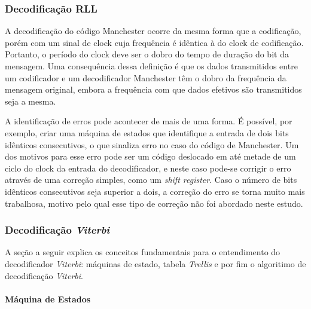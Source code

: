 	\subsubsection{Decodificação RLL}
	
	A decodificação do código Manchester ocorre da mesma forma que a codificação, porém com um sinal de clock cuja frequência é idêntica à do clock de codificação. Portanto, o período do clock deve ser o dobro do tempo de duração do bit da mensagem. Uma consequência dessa definição é que os dados transmitidos entre um codificador e um decodificador Manchester têm o dobro da frequência da mensagem original, embora a frequência com que dados efetivos são transmitidos seja a mesma.
	
	A identificação de erros pode acontecer de mais de uma forma. É possível, por exemplo, criar uma máquina de estados que identifique a entrada de dois bits idênticos consecutivos, o que sinaliza erro no caso do código de Manchester. Um dos motivos para esse erro pode ser um código deslocado em até metade de um ciclo do clock da entrada do decodificador, e neste caso pode-se corrigir o erro através de uma correção simples, como um \textit{shift register}. Caso o número de bits idênticos consecutivos seja superior a dois, a correção do erro se torna muito mais trabalhosa, motivo pelo qual esse tipo de correção não foi abordado neste estudo.
	
	\subsubsection{Decodificação \textit{Viterbi}}
	
	A seção a seguir explica os conceitos fundamentais para o entendimento do decodificador \textit{Viterbi}: máquinas de estado, tabela \textit{Trellis} e por fim o algoritimo de decodificação \textit{Viterbi}.
	
	\paragraph{Máquina de Estados}
	
